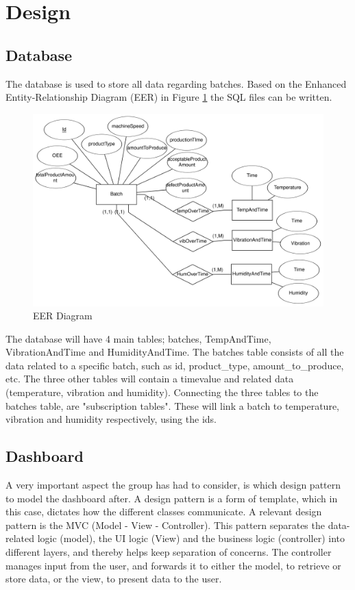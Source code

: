 \section{Design}

\subsection{Database}
The database is used to store all data regarding batches. Based on the
Enhanced Entity-Relationship Diagram (EER) in Figure \ref{figure:eer_diagram}
the SQL files can be written.

\begin{figure}[ht]
\centering 
\includegraphics[width=0.8\linewidth]{images/eer_diagrams/database_EER_batch.png}
\caption{EER Diagram} 
\label{figure:eer_diagram}
\end{figure}

The database will have 4 main tables; batches, TempAndTime, VibrationAndTime and
HumidityAndTime. The batches table consists of all the data related to a
specific batch, such as id, product\_type, amount\_to\_produce, etc. The three
other tables will contain a timevalue and related data (temperature, vibration
and humidity).
Connecting the three tables to the batches table, are "subscription tables".
These will link a batch to temperature, vibration and humidity respectively,
using the ids.

\subsection{Dashboard}
A very important aspect the group has had to consider, is which design pattern
to model the dashboard after. A design pattern is a form of template, which in
this case, dictates how the different classes communicate. A relevant design
pattern is the MVC (Model - View - Controller). This pattern separates the
data-related logic (model), the UI logic (View) and the business logic 
(controller) into different layers, and thereby helps keep separation of
concerns. The controller manages input from the user, and forwards it to either
the model, to retrieve or store data, or the view, to present data to the user.\\

